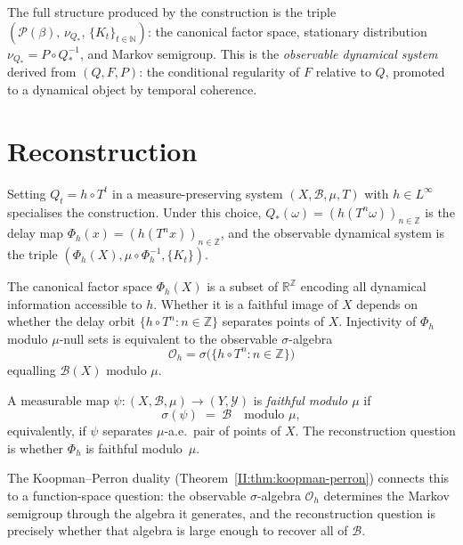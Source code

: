 The full structure produced by the construction is the triple
$(\mathcal{P}(\beta),\, \nu_{Q_*},\, \{K_t\}_{t \in \mathbb{N}})$:
the canonical factor space, stationary distribution $\nu_{Q_*} = P \circ Q_*^{-1}$,
and Markov semigroup.  This is the \emph{observable dynamical system}
derived from $(Q, F, P)$: the conditional regularity of $F$ relative to $Q$,
promoted to a dynamical object by temporal coherence.

\section{Reconstruction}
\label{II:sec:reconstruction}

Setting $Q_t = h \circ T^t$ in a measure-preserving system
$(X, \mathcal{B}, \mu, T)$ with $h \in L^\infty$ specialises the construction.
Under this choice, $Q_*(\omega) = (h(T^n \omega))_{n \in \mathbb{Z}}$ is the
delay map $\Phi_h(x) = (h(T^n x))_{n \in \mathbb{Z}}$, and the observable
dynamical system is the triple $(\Phi_h(X), \mu \circ \Phi_h^{-1}, \{K_t\})$.

The canonical factor space $\Phi_h(X)$ is a subset of $\mathbb{R}^\mathbb{Z}$
encoding all dynamical information accessible to $h$.  Whether it is a faithful
image of $X$ depends on whether the delay orbit
$\{h \circ T^n : n \in \mathbb{Z}\}$ separates points of $X$.
Injectivity of $\Phi_h$ modulo $\mu$-null sets is equivalent to the observable
$\sigma$-algebra
\[
  \mathcal{O}_h = \sigma\!\bigl(\{h \circ T^n : n \in \mathbb{Z}\}\bigr)
\]
equalling $\mathcal{B}(X)$ modulo $\mu$.

\begin{definition}
\label{II:def:faithful}
A measurable map $\psi : (X, \mathcal{B}, \mu) \to (Y, \mathcal{Y})$ is
\emph{faithful modulo $\mu$} if
\[
  \sigma(\psi) \;=\; \mathcal{B} \quad \text{modulo } \mu,
\]
equivalently, if $\psi$ separates $\mu$-a.e.\ pair of points of $X$.
The reconstruction question is whether $\Phi_h$ is faithful modulo~$\mu$.
\end{definition}

The Koopman--Perron duality (Theorem~\ref{II:thm:koopman-perron}) connects this to a
function-space question: the observable $\sigma$-algebra $\mathcal{O}_h$ determines
the Markov semigroup through the algebra it generates, and the reconstruction question
is precisely whether that algebra is large enough to recover all of $\mathcal{B}$.


